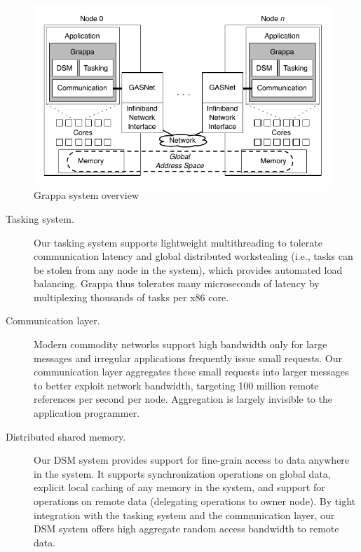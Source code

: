 \begin{figure}[t]
\begin{center}
  \includegraphics[width=0.95\columnwidth]{../asplos13/figs/system-overview}
\begin{minipage}{0.95\columnwidth}
  \caption{\label{fig:grappa} Grappa system overview}
\end{minipage}
\vspace{-3ex}
\end{center}
\end{figure}


\begin{description}

\item [Tasking system.] Our tasking system supports lightweight
multithreading to tolerate communication latency and global distributed
workstealing (i.e., tasks can be stolen from any node in the system), which
provides automated load balancing.  Grappa thus tolerates many
microseconds of latency by multiplexing thousands of tasks per x86 core.

\item[Communication layer.] Modern commodity networks
support high bandwidth only for large messages and irregular applications
frequently issue small requests.   Our communication layer aggregates these small requests into larger messages to better exploit network bandwidth, targeting 100 million remote references per second per node.  Aggregation is largely invisible to the application programmer.

\item[Distributed shared memory.] Our DSM system provides support for
fine-grain access to data anywhere in the system. It supports synchronization
operations on global data, explicit local caching of any memory in the system,
and support for operations on remote data (delegating operations to owner node).
By tight integration with the tasking system and the
communication layer, our DSM system offers high aggregate random
access bandwidth to remote data.


\end{description}

